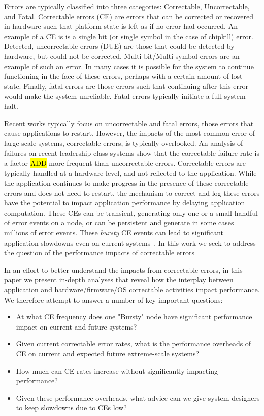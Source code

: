 Errors are typically classified into three categories: Correctable,
Uncorrectable, and Fatal. Correctable errors (CE) are errors that can be
corrected or recovered in hardware such that platform state is left as if no
error had occurred.  An example of a CE is is a single bit (or single symbol in
the case of chipkill) error.  Detected, uncorrectable errors (DUE) are those
that could be detected by hardware, but could not be corrected.
Multi-bit/Multi-symbol errors are an example of such an error.  In many cases
it is possible for the system to continue functioning in the face of these
errors, perhaps with a certain amount of lost state.  Finally, fatal errors are
those errors such that continuing after this error would make the system
unreliable.  Fatal errors typically initiate a full system halt.

Recent works typically focus on uncorrectable and fatal errors, those errors
that cause applications to restart.  However, the impacts of the most common
error of large-scale systems, correctable errors, is typically overlooked. An
analysis of failures on recent leadership-class systems show that the
correctable failure rate is a factor \hl{ADD} more frequent than uncorrectable
errors.  Correctable errors are typically handled at a hardware level, and not
reflected to the application.  While the application continues to make progress
in the presence of these correctable errors and does not need to restart, the
mechanism to correct and log these errors have the potential to impact
application performance by delaying application computation. These CEs can be
transient, generating only one or a small handful of error events on a node, or
can be persistent and generate in some cases millions of error events.  These
\emph{bursty} CE events can lead to significant application slowdowns even on
current systems~\cite{BURSTY}.  In this work we seek to address the question of
the performance impacts of correctable errors



In an effort to better understand the impacts from correctable errors, in this
paper we present in-depth analyses that reveal how the interplay between
application and hardware/firmware/OS correctable activities impact performance.
We therefore attempt to answer a number of key important questions:

\begin{itemize}
        \item At what CE frequency does one "Bursty" node have significant
              performance impact on current and future systems?
        \item Given current correctable error rates, what is the performance
              overheads of CE on current and expected future extreme-scale systems?
        \item How much can CE rates increase without significantly impacting
              performance?
        \item Given these performance overheads, what advice can we give system
              designers to keep slowdowns due to CEs low?
\end{itemize}

